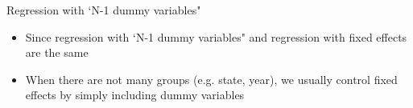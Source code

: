 \documentclass[dvipsnames,hyperref={pdfpagelabels=false}]{beamer}
\begin{document}
\begin{frame}{Regression with `N-1 dummy variables"}
	\begin{itemize}
		\item Since regression with `N-1 dummy variables" and regression with fixed effects are the same
		\vspace{0.2cm}
		\item When there are not many groups (e.g. state, year), we usually control fixed effects by simply including dummy variables
	\end{itemize}
\end{frame}
\end{document}
